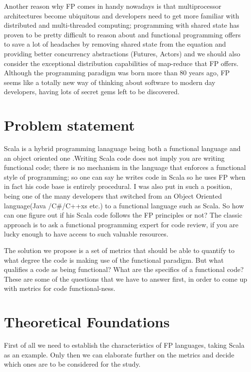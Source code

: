\documentclass{article}
\begin{document}
Another reason why FP comes in handy nowadays is that multiprocessor architectures become ubiquitous and developers need to get more familiar with distributed and multi-threaded computing; programming with shared state has proven to be pretty difficult to reason about and functional programming offers to save a lot of headaches by removing shared state from the equation and providing better concurrency abstractions (Futures, Actors) and we should also consider  the exceptional distribution capabilities of map-reduce that FP offers. Although the programming paradigm was born more than 80 years ago, FP seems like a totally new way of thinking about software to modern day developers, having lots of secret gems left to be discovered. \par

\section {Problem statement}
Scala is a hybrid programming lanaguage being both a functional language and an object oriented one \cite{scalalang:1}.Writing Scala code does not imply you are writing functional code;  there is no mechanism in the language that enforces a functional style of programming; so one can say he writes code in Scala so he uses FP when in fact his code base is entirely procedural. I was also put in such a position,  being one of the many  developers that  switched from an Object Oriented language(Java /C\#/C++xs etc.)  to a functional language such as Scala. So how can one figure out if his Scala code follows the FP principles or not? The classic approach is to ask a functional programming expert for code review, if you are lucky enough to have access to such valuable resources. \par

The solution we propose is a set of metrics that should be able to quantify to what degree the code is making use of the functional paradigm. But what  qualifies a code as being functional? What are the specifics of a functional code? These are some of the questions that we have to answer first, in order to come up with metrics for code functional-ness.\par

\section {Theoretical Foundations}
First of all we need to establish the characteristics of FP languages, taking Scala as an example. Only then we can elaborate further on the metrics and decide which ones are to be considered for the study. \par
\end{document}
